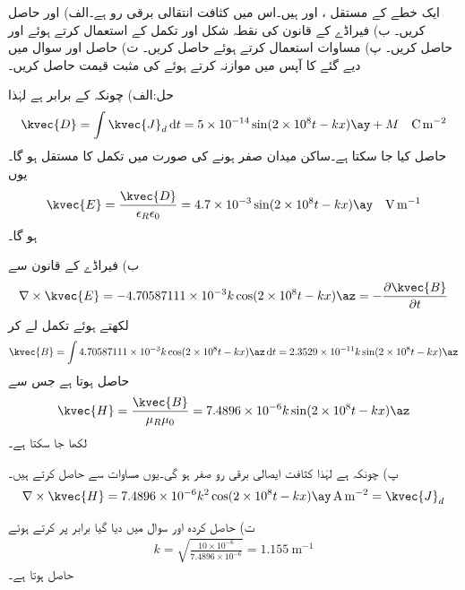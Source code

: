 ایک خطے کے مستقل ،  اور  ہیں۔اس میں کثافت انتقالی برقی رو  ہے۔الف)  اور  حاصل کریں۔ ب) فیراڈے کے قانون کی نقطہ شکل اور تکمل کے استعمال کرتے ہوئے  اور  حاصل کریں۔ پ) مساوات  استعمال کرتے ہوئے  حاصل کریں۔ ت) حاصل  اور سوال میں دیے  گئے  کا آپس میں موازنہ کرتے ہوئے  کی مثبت قیمت حاصل کریں۔

حل:الف)  چونکہ  کے برابر ہے لہٰذا
\begin{align*}
\kvec{D}=\int \kvec{J}_d \dif t=5\times 10^{-14} \sin (2\times 10^8 t - k x) \ay +M \quad \si{\coulomb \per\meter\squared}
\end{align*}
حاصل کیا جا سکتا ہے۔ساکن میدان صفر ہونے کی صورت میں تکمل کا مستقل  ہو گا۔یوں
\begin{align*}
\kvec{E}=\frac{\kvec{D}}{\epsilon_R \epsilon_0}=4.7\times 10^{-3} \sin (2\times 10^8 t - k x) \ay \quad \si{\volt\per\meter}
\end{align*}
ہو گا۔

ب) فیراڈے کے قانون سے
\begin{align*}
\nabla \times \kvec{E}=-4.70587111\times 10^{-3} k \cos (2\times 10^8 t - k x) \az=-\frac{\partial \kvec{B}}{\partial t}
\end{align*}
لکھتے ہوئے تکمل لے کر
\begin{align*}
\kvec{B}=\int 4.70587111\times 10^{-3} k \cos (2\times 10^8 t - k x) \az \dif t=2.3529\times 10^{-11} k \sin(2\times 10^8 t - k x) \az
\end{align*}
حاصل ہوتا ہے جس سے
\begin{align*}
\kvec{H}=\frac{\kvec{B}}{\mu_R \mu_0}=7.4896\times 10^{-6} k \sin(2\times 10^8 t - k x) \az
\end{align*}
لکھا جا سکتا ہے۔

پ) چونکہ  ہے لہٰذا کثافت ایصالی برقی رو صفر ہو گی۔یوں مساوات  سے  حاصل کرتے ہیں۔
\begin{align*}
\nabla \times \kvec{H}=7.4896 \times 10^{-6} k^2 \cos (2\times 10^8 t - k x) \ay \, \si{\ampere\per\meter\squared}=\kvec{J}_d
\end{align*}

ت) حاصل کردہ اور سوال میں دیا گیا  برابر پر کرتے ہوئے
\begin{align*}
k=\sqrt{\frac{10\times 10^{-6}}{7.4896\times 10^{-6}}}=\SI{1.155}{\meter^{-1}}
\end{align*}
حاصل ہوتا ہے۔

